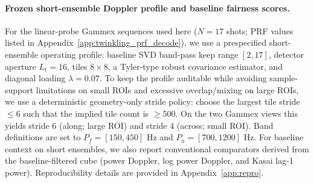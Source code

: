 \documentclass[11pt]{article}
\newcommand{\Pf}{P_f}
\newcommand{\Pa}{P_a}
\newif\ifSTAPPAPERONLY
\newcommand{\SuppOrApp}[1]{\ifSTAPPAPERONLY Supplementary Material\else Appendix~\ref{#1}\fi}
\begin{document}
\paragraph{Frozen short-ensemble Doppler profile and baseline fairness scores.}
For the linear-probe Gammex sequences used here ($N=17$ shots; PRF values listed in \SuppOrApp{app:twinkling_prf_decode}), we use a prespecified short-ensemble operating profile: baseline SVD band-pass keep range $[2,17]$, detector aperture $L_t=16$, tiles $8\times 8$, a Tyler-type robust covariance estimator, and diagonal loading $\lambda=0.07$. To keep the profile auditable while avoiding sample-support limitations on small ROIs and excessive overlap/mixing on large ROIs, we use a deterministic geometry-only stride policy: choose the largest tile stride $\le 6$ such that the implied tile count is $\ge 500$. On the two Gammex views this yields stride 6 (along; large ROI) and stride 4 (across; small ROI). Band definitions are set to $\Pf=[150,450]$ Hz and $\Pa=[700,1200]$ Hz. For baseline context on short ensembles, we also report conventional comparators derived from the baseline-filtered cube (power Doppler, log power Doppler, and Kasai lag-1 power). Reproducibility details are provided in \SuppOrApp{app:repro}.
\end{document}
